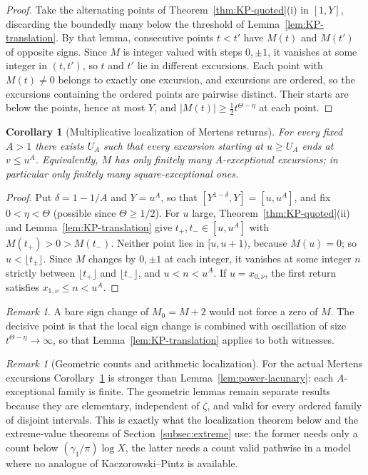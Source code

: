 \documentclass[11pt]{amsart}
\numberwithin{equation}{section}
\theoremstyle{plain}
\newtheorem{corollary}[theorem]{Corollary}
\theoremstyle{definition}
\theoremstyle{remark}
\newtheorem{remark}[theorem]{Remark}
\begin{document}
\begin{proof}
Take the alternating points of Theorem~\ref{thm:KP-quoted}(i) in $[1,Y]$,
discarding the boundedly many below the threshold of
Lemma~\ref{lem:KP-translation}. By that lemma, consecutive points $t<t'$
have $M(t)$ and $M(t')$ of opposite signs. Since $M$ is integer valued with
steps $0,\pm1$, it vanishes at some integer in $(t,t')$, so $t$ and $t'$ lie
in different excursions. Each point with $M(t)\ne0$ belongs to exactly one
excursion, and excursions are ordered, so the excursions containing the
ordered points are pairwise distinct. Their starts are below the points,
hence at most $Y$, and $|M(t)|\ge\frac12t^{\Theta-\eta}$ at each point.
\end{proof}

\begin{corollary}[Multiplicative localization of Mertens returns]
\label{cor:KP-local-returns}
\label{cor:finiteness_expanding}
For every fixed $A>1$ there exists $U_A$ such that every excursion starting
at $u\ge U_A$ ends at $v\le u^A$. Equivalently, $M$ has only finitely many
$A$-exceptional excursions; in particular only finitely many
square-exceptional ones.
\end{corollary}

\begin{proof}
Put $\delta=1-1/A$ and $Y=u^A$, so that $[Y^{1-\delta},Y]=[u,u^A]$, and fix
$0<\eta<\Theta$ (possible since $\Theta\ge1/2$). For $u$ large,
Theorem~\ref{thm:KP-quoted}(ii) and Lemma~\ref{lem:KP-translation} give
$t_+,t_-\in[u,u^A]$ with $M(t_+)>0>M(t_-)$. Neither point lies in $[u,u+1)$,
because $M(u)=0$; so $u<\lfloor t_\pm\rfloor$. Since $M$ changes by
$0,\pm1$ at each integer, it vanishes at some integer $n$ strictly between
$\lfloor t_+\rfloor$ and $\lfloor t_-\rfloor$, and $u<n<u^A$. If
$u=x_{0,\nu}$, the first return satisfies $x_{1,\nu}\le n<u^A$.
\end{proof}

\begin{remark}
A bare sign change of $M_0=M+2$ would not force a zero of $M$. The
decisive point is that the local sign change is combined with oscillation of
size $t^{\Theta-\eta}\to\infty$, so that Lemma~\ref{lem:KP-translation}
applies to both witnesses.
\end{remark}

\begin{remark}[Geometric counts and arithmetic localization]
\label{rem:geom-vs-arith}
For the actual Mertens excursions Corollary~\ref{cor:KP-local-returns} is
stronger than Lemma~\ref{lem:power-lacunary}: each $A$-exceptional family is
finite. The geometric lemmas remain separate results because they are
elementary, independent of $\zeta$, and valid for every ordered family of
disjoint intervals. This is exactly what the localization theorem below and
the extreme-value theorems of Section~\ref{subsec:extreme} use: the former
needs only a count below $(\gamma_1/\pi)\log X$, the latter needs a count
valid pathwise in a model where no analogue of Kaczorowski--Pintz is
available.
\end{remark}
\end{document}
